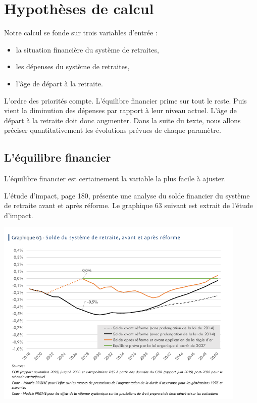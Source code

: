 \documentclass[10pt]{article}
\begin{document}

\section{Hypothèses de calcul}

Notre calcul se fonde sur trois variables d'entrée :
\begin{itemize}
\item la situation financière du système de retraites, 
\item les dépenses du système de retraites, 
\item l'âge de départ à la retraite. 
\end{itemize}

L'ordre des priorités compte. 
L'équilibre financier prime sur tout le reste. 
Puis vient la diminution des dépenses par rapport à leur niveau actuel. 
L'âge de départ à la retraite doit donc augmenter. 
Dans la suite du texte, nous allons préciser quantitativement 
les évolutions prévues de chaque paramètre. 


\subsection{L'équilibre financier}

L'équilibre financier est certainement la variable 
la plus facile à ajuster. 

L'étude d'impact, page 180, présente une analyse du solde financier du système de retraite 
avant et après réforme.
Le graphique 63 suivant est extrait de l'étude d'impact. 

\begin{center}
\includegraphics[width=0.9\textwidth]{EtudeImpact-situation-financiere.png}
\end{center}
\end{document}
